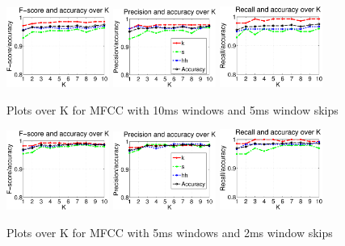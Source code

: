 		\begin{figure}
			\centering\includegraphics[width=0.3\textwidth]{tex/appendices/test/mfcc105FP.png}
			\centering\includegraphics[width=0.3\textwidth]{tex/appendices/test/mfcc105_P.png}
			\centering\includegraphics[width=0.3\textwidth]{tex/appendices/test/mfcc105_R.png}
			
			\caption{Plots over K for MFCC with 10ms windows and 5ms window skips}
		\end{figure}
		\begin{figure}
			\centering\includegraphics[width=0.3\textwidth]{tex/appendices/test/mfcc52FP.png}
			\centering\includegraphics[width=0.3\textwidth]{tex/appendices/test/mfcc52_P.png}
			\centering\includegraphics[width=0.3\textwidth]{tex/appendices/test/mfcc52_R.png}
			
			\caption{Plots over K for MFCC with 5ms windows and 2ms window skips}
		\end{figure}\clearpage
		

